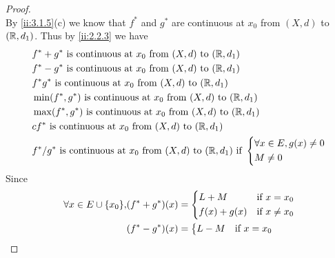 \begin{proof}
\[  \]
  By \cref{ii:3.1.5}(c) we know that \(f^*\) and \(g^*\) are continuous at \(x_0\) from \((X, d)\) to \((\mathbb{R}, d_1)\).
  Thus by \cref{ii:2.2.3} we have
  \begin{align*}
     & f^* + g^* \text{ is continuous at } x_0 \text{ from } (X, d) \text{ to } (\mathbb{R}, d_1)                                          \\
     & f^* - g^* \text{ is continuous at } x_0 \text{ from } (X, d) \text{ to } (\mathbb{R}, d_1)                                          \\
     & f^* g^* \text{ is continuous at } x_0 \text{ from } (X, d) \text{ to } (\mathbb{R}, d_1)                                            \\
     & \min(f^*, g^*) \text{ is continuous at } x_0 \text{ from } (X, d) \text{ to } (\mathbb{R}, d_1)                                     \\
     & \max(f^*, g^*) \text{ is continuous at } x_0 \text{ from } (X, d) \text{ to } (\mathbb{R}, d_1)                                     \\
     & c f^* \text{ is continuous at } x_0 \text{ from } (X, d) \text{ to } (\mathbb{R}, d_1)                                              \\
     & f^* / g^* \text{ is continuous at } x_0 \text{ from } (X, d) \text{ to } (\mathbb{R}, d_1) \text{ if } \begin{dcases}
                                                                                                        \forall x \in E, g(x) \neq 0 \\
                                                                                                        M \neq 0
                                                                                                      \end{dcases}
  \end{align*}
  Since
  \begin{align*}
    \forall x \in E \cup \set{x_0}, & (f^* + g^*)(x) = \begin{dcases}
                                                         L + M       & \text{if } x = x_0    \\
                                                         f(x) + g(x) & \text{if } x \neq x_0
                                                       \end{dcases}                     \\
                                    & (f^* - g^*)(x) = \begin{dcases}
                                                         L - M       & \text{if } x = x_0    \\

\end{dcases}
\end{align*}
\end{proof}
